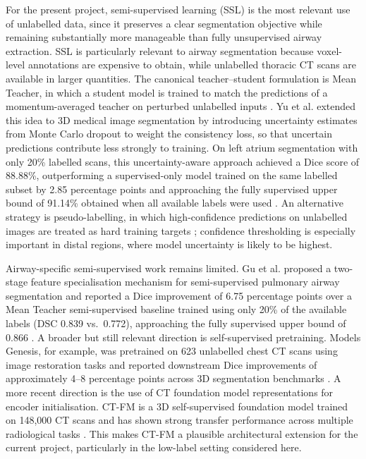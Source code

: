 \documentclass[11pt,a4paper]{article}
\begin{document}
For the present project, semi-supervised learning (SSL) is the most relevant use of unlabelled data, since it preserves a clear segmentation objective while remaining substantially more manageable than fully unsupervised airway extraction. SSL is particularly relevant to airway segmentation because voxel-level annotations are expensive to obtain, while unlabelled thoracic CT scans are available in larger quantities. The canonical teacher--student formulation is Mean Teacher, in which a student model is trained to match the predictions of a momentum-averaged teacher on perturbed unlabelled inputs \cite{Tarvainen2017MeanTeacher}. Yu et al. extended this idea to 3D medical image segmentation by introducing uncertainty estimates from Monte Carlo dropout to weight the consistency loss, so that uncertain predictions contribute less strongly to training. On left atrium segmentation with only 20\% labelled scans, this uncertainty-aware approach achieved a Dice score of 88.88\%, outperforming a supervised-only model trained on the same labelled subset by 2.85 percentage points and approaching the fully supervised upper bound of 91.14\% obtained when all available labels were used \cite{Yu2019UncertaintyAwareMT}. An alternative strategy is pseudo-labelling, in which high-confidence predictions on unlabelled images are treated as hard training targets \cite{Lee2013PseudoLabel}; confidence thresholding is especially important in distal regions, where model uncertainty is likely to be highest.

Airway-specific semi-supervised work remains limited. Gu et al. proposed a two-stage feature specialisation mechanism for semi-supervised pulmonary airway segmentation and reported a Dice improvement of 6.75 percentage points over a Mean Teacher semi-supervised baseline trained using only 20\% of the available labels (DSC 0.839 vs.\ 0.772), approaching the fully supervised upper bound of 0.866 \cite{Gu2023TFSM}. A broader but still relevant direction is self-supervised pretraining. Models Genesis, for example, was pretrained on 623 unlabelled chest CT scans using image restoration tasks and reported downstream Dice improvements of approximately 4--8 percentage points across 3D segmentation benchmarks \cite{Zhou2021ModelsGenesis}. A more recent direction is the use of CT foundation model representations for encoder initialisation. CT-FM is a 3D self-supervised foundation model trained on 148{,}000 CT scans and has shown strong transfer performance across multiple radiological tasks \cite{Pai2025CTFM}. This makes CT-FM a plausible architectural extension for the current project, particularly in the low-label setting considered here.
\end{document}
